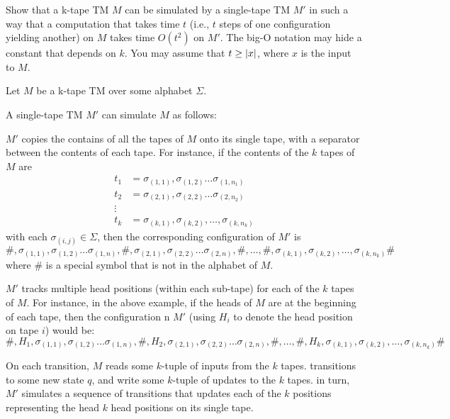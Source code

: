 \begin{problem}
  Show that a k-tape TM $M$ can be simulated by a single-tape TM $M'$
  in such a way that a computation that takes time $t$
  (i.e., $t$ steps of one configuration yielding another)
  on $M$ takes time $O(t^2)$ on $M'$.
  The big-O notation may hide a constant that depends on $k$.
  You may assume that $t \geq \lvert x\rvert$, where $x$ is the input to $M$.
\end{problem}

\begin{Answer}
  Let $M$ be a k-tape TM over some alphabet $\Sigma$.

  \step
  A single-tape TM $M'$ can simulate $M$ as follows:
  \begin{enumroman}
    \item $M'$ copies the contains of all the tapes of $M$ onto its single
      tape, with a separator between the contents of each tape.
      For instance, if the contents of the $k$ tapes of $M$
      are \begin{align*}
        t_1 &= \sigma_{(1, 1)}, \sigma_{(1, 2)} \ldots \sigma_{(1, n_1)} \\
        t_2 &= \sigma_{(2, 1)}, \sigma_{(2, 2)} \ldots \sigma_{(2, n_2)} \\
        \vdots \\
        t_k &= \sigma_{(k, 1)}, \sigma_{(k, 2)}, \ldots, \sigma_{(k, n_k)}
      \end{align*}
      with each $\sigma_{(i, j)} \in \Sigma$,
      then the corresponding configuration of $M'$ is
      \[ 
        \#, \sigma_{(1, 1)}, \sigma_{(1, 2)} \ldots \sigma_{(1, n)},
        \#, \sigma_{(2, 1)}, \sigma_{(2, 2)} \ldots \sigma_{(2, n)},
        \#, \ldots, 
        \#, \sigma_{(k, 1)}, \sigma_{(k, 2)}, \ldots, \sigma_{(k, n_k)} \#
      \]
      where $\#$ is a special symbol that is not in the alphabet of $M$.
    \item $M'$ tracks multiple head positions (within each sub-tape)
      for each of the $k$ tapes of $M$.
      For instance, in the above example, if the heads of $M$ are at
      the beginning of each tape, then the configuration n $M'$
      (using $H_i$ to denote the head position on tape $i$)
      would be:
      \[
        \#, H_1, \sigma_{(1, 1)}, \sigma_{(1, 2)} \ldots \sigma_{(1, n)},
        \#, H_2, \sigma_{(2, 1)}, \sigma_{(2, 2)} \ldots \sigma_{(2, n)},
        \#, \ldots, 
        \#, H_k, \sigma_{(k, 1)}, \sigma_{(k, 2)}, \ldots, \sigma_{(k, n_k)} \#
      \]

    \item On each transition, $M$ reads some $k$-tuple of inputs from the $k$ tapes.
      transitions to some new state $q$, and write some $k$-tuple of updates
      to the $k$ tapes.
      in turn, $M'$ simulates a sequence of transitions that updates
      each of the $k$ positions representing the head $k$ head positions
      on its single tape.
  \end{enumroman}


\end{Answer}
